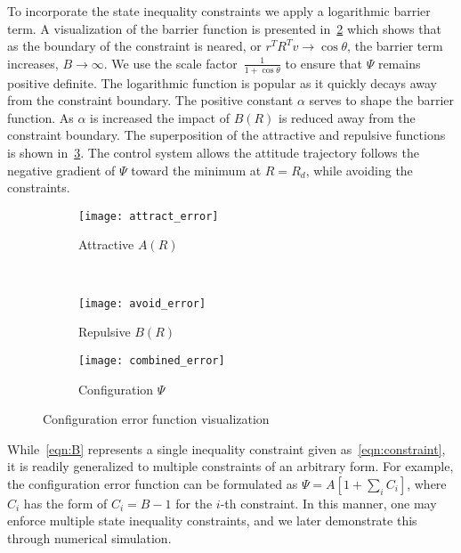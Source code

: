 \documentclass[letterpaper, 10 pt, conference]{ieeeconf}  %
\begin{document}
To incorporate the state inequality constraints we apply a logarithmic barrier term.
A visualization of the barrier function is presented in~\cref{fig:avoid_error} which shows that as the boundary of the constraint is neared, or \( r^T R^T v \to \cos \theta \), the barrier term increases, \( B \to \infty\).
We use the scale factor~\(\frac{1}{1+\cos \theta} \) to ensure that \( \Psi \) remains positive definite.
The logarithmic function is popular as it quickly decays away from the constraint boundary.
The positive constant \( \alpha \) serves to shape the barrier function.
As \( \alpha \) is increased the impact of \( B(R) \) is reduced away from the constraint boundary. 
The superposition of the attractive and repulsive functions is shown in~\cref{fig:combined_error}.
The control system allows the attitude trajectory follows the negative gradient of \( \Psi \) toward the minimum at \( R = R_d \), while avoiding the constraints.
\begin{figure} 
	\centering 
	\begin{subfigure}[htbp]{0.45\columnwidth} 
		\texttt{[image: attract\_error]} 
		\caption{Attractive \( A(R) \) } \label{fig:attract_error} 
	\end{subfigure}~ %
	\begin{subfigure}[htbp]{0.45\columnwidth} 
		\texttt{[image: avoid\_error]} 
		\caption{Repulsive \( B(R) \)} \label{fig:avoid_error} 
	\end{subfigure}
	\centering
	\begin{subfigure}[htbp]{0.45\columnwidth} 
		\texttt{[image: combined\_error]} 
		\caption{Configuration \( \Psi \)} \label{fig:combined_error} 
	\end{subfigure}
	\caption{Configuration error function visualization}
	\label{fig:config_error} 
\end{figure}

While~\cref{eqn:B} represents a single inequality constraint given as~\cref{eqn:constraint}, it is readily generalized to multiple constraints of an arbitrary form. 
For example, the configuration error function can be formulated as $\Psi=A[1+\sum_i C_i]$, where $C_i$ has the form of $C_i=B-1$ for the $i$-th constraint. 
In this manner, one may enforce multiple state inequality constraints, and we later demonstrate this through numerical simulation. 
\end{document}
